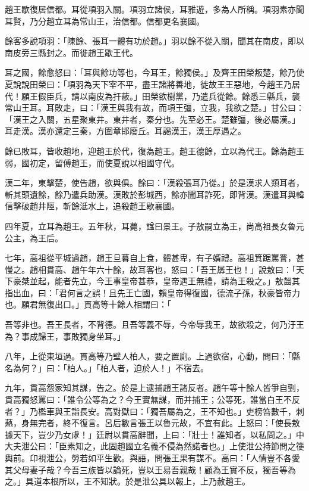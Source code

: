 \begin{pinyinscope}
趙王歇復居信都。耳從項羽入關。項羽立諸侯，耳雅遊，多為人所稱。項羽素亦聞耳賢，乃分趙立耳為常山王，治信都。信都更名襄國。

餘客多說項羽：「陳餘、張耳一體有功於趙。」羽以餘不從入關，聞其在南皮，即以南皮旁三縣封之。而徙趙王歇王代。

耳之國，餘愈怒曰：「耳與餘功等也，今耳王，餘獨侯。」及齊王田榮叛楚，餘乃使夏說說田榮曰：「項羽為天下宰不平，盡王諸將善地，徙故王王惡地，今趙王乃居代！願王假臣兵，請以南皮為扞蔽。」田榮欲樹黨，乃遣兵從餘。餘悉三縣兵，襲常山王耳。耳敗走，曰：「漢王與我有故，而項王彊，立我，我欲之楚。」甘公曰：「漢王之入關，五星聚東井。東井者，秦分也。先至必王。楚雖彊，後必屬漢。」耳走漢。漢亦還定三秦，方圍章邯廢丘。耳謁漢王，漢王厚遇之。

餘已敗耳，皆收趙地，迎趙王於代，復為趙王。趙王德餘，立以為代王。餘為趙王弱，國初定，留傅趙王，而使夏說以相國守代。

漢二年，東擊楚，使告趙，欲與俱。餘曰：「漢殺張耳乃從。」於是漢求人類耳者，斬其頭遺餘，餘乃遣兵助漢。漢敗於彭城西，餘亦聞耳詐死，即背漢。漢遣耳與韓信擊破趙井陘，斬餘泜水上，追殺趙王歇襄國。

四年夏，立耳為趙王。五年秋，耳薨，諡曰景王。子敖嗣立為王，尚高祖長女魯元公主，為王后。

七年，高祖從平城過趙，趙王旦暮自上食，體甚卑，有子婿禮。高祖箕踞罵詈，甚慢之。趙相貫高、趙午年六十餘，故耳客也，怒曰：「吾王孱王也！」說敖曰：「天下豪桀並起，能者先立，今王事皇帝甚恭，皇帝遇王無禮，請為王殺之。」敖齧其指出血，曰：「君何言之誤！且先王亡國，賴皇帝得復國，德流子孫，秋豪皆帝力也。願君無復出口。」貫高等十餘人相謂曰：「

吾等非也。吾王長者，不背德。且吾等義不辱，今帝辱我王，故欲殺之，何乃汙王為？事成歸王，事敗獨身坐耳。」

八年，上從東垣過。貫高等乃壁人柏人，要之置廁。上過欲宿，心動，問曰：「縣名為何？」曰：「柏人。」「柏人者，迫於人！」不宿去。

九年，貫高怨家知其謀，告之。於是上逮捕趙王諸反者。趙午等十餘人皆爭自剄，貫高獨怒罵曰：「誰令公等為之？今王實無謀，而并捕王；公等死，誰當白王不反者？」乃檻車與王詣長安。高對獄曰：「獨吾屬為之，王不知也。」吏榜笞數千，刺爇，身無完者，終不復言。呂后數言張王以魯元故，不宜有此。上怒曰：「使長敖據天下，豈少乃女虖！」廷尉以貫高辭聞，上曰：「壯士！誰知者，以私問之。」中大夫泄公曰：「臣素知之，此固趙國立名義不侵為然諾者也。」上使泄公持節問之箯輿前。卬視泄公，勞若如平生歡。與語，問張王果有謀不。高曰：「人情豈不各愛其父母妻子哉？今吾三族皆以論死，豈以王易吾親哉！顧為王實不反，獨吾等為之。」具道本根所以，王不知狀。於是泄公具以報上，上乃赦趙王。


\end{pinyinscope}
